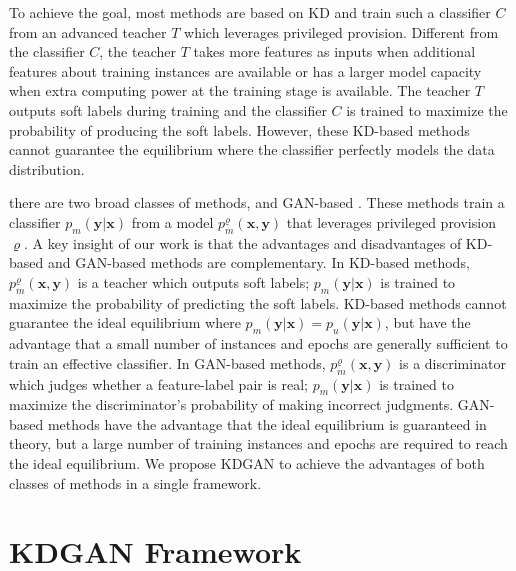 \documentclass{article}
\newcommand{\bo}[1]{}
\newcommand{\bo}[1]{{\color{cyan}[Bo: #1]}}
\newcommand{\OVEC}[1]{\bm{#1}} %
\newcommand{\classifier}{C}
\newcommand{\teacher}{T}
\newcommand{\pclf}{p_{m}(\OVEC{y}|\OVEC{x})}
\newcommand{\ppri}{p_{m}^{\varrho}(\OVEC{x},\OVEC{y})}
\newcommand{\fullpdat}{p_{u}(\OVEC{y}|\OVEC{x})}
\begin{document}
To achieve the goal, most methods \cite{hinton2015distilling,lopez2015unifying,vapnik2015learning} are based on KD and train such a classifier $\classifier$ from an advanced teacher $\teacher$ which leverages privileged provision.
Different from the classifier $\classifier$, the teacher $\teacher$ takes more features as inputs when additional features about training instances are available or has a larger model capacity when extra computing power at the training stage is available.
The teacher $\teacher$ outputs soft labels during training and the classifier $\classifier$ is trained to maximize the probability of producing the soft labels.
However, these KD-based methods cannot guarantee the equilibrium where the classifier perfectly models the data distribution.

there are two broad classes of methods,  \cite{sau2016deep} and GAN-based \cite{wang2017irgan}.
These methods train a classifier $\pclf$ from a model $\ppri$ that leverages privileged provision $\varrho$. \bo{name the GAN-Based KD}
A key insight of our work is that the advantages and disadvantages of KD-based and GAN-based methods are complementary.
In KD-based methods, $\ppri$ is a teacher which outputs soft labels;
$\pclf$ is trained to maximize the probability of predicting the soft labels.
KD-based methods cannot guarantee the ideal equilibrium where $\pclf=\fullpdat$, but have the advantage that a small number of instances and epochs are generally sufficient to train an effective classifier.
In GAN-based methods, $\ppri$ is a discriminator which judges whether a feature-label pair is real;
$\pclf$ is trained to maximize the discriminator's probability of making incorrect judgments.
GAN-based methods have the advantage that the ideal equilibrium is guaranteed in theory, but a large number of training instances and epochs are required to reach the ideal equilibrium.
We propose KDGAN to achieve the advantages of both classes of methods in a single framework.



\section{KDGAN Framework}
\end{document}
